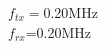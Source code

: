 \documentclass[preview]{standalone}
\begin{document}
\begin{center}
$f_{tx}=$0.20MHz\\$f_{rx}$=0.20MHz
\end{center}
\end{document}
